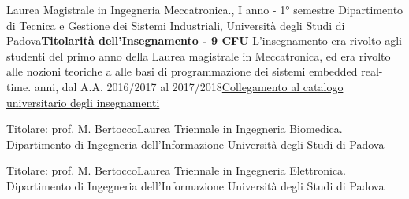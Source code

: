 {
    {Laurea Magistrale in Ingegneria Meccatronica., I anno - 1° semestre}
    {\newline  Dipartimento di Tecnica e Gestione dei Sistemi Industriali, Università degli Studi di Padova\newline \textbf{Titolarità dell'Insegnamento - 9 CFU}\newline
        L'insegnamento era rivolto agli studenti del primo anno della Laurea magistrale in Meccatronica, ed era rivolto alle nozioni teoriche a alle basi di programmazione dei sistemi embedded real-time.}{ anni, dal A.A. 2016/2017 al 2017/2018}{\href{https://didattica.unipd.it/off/2017/LM/IN/IN0529/000ZZ/IN01122661/N0}{Collegamento al catalogo universitario degli insegnamenti}}


{Titolare: prof. M. Bertocco\newline Laurea Triennale in Ingegneria Biomedica.\newline
Dipartimento di Ingegneria dell'Informazione}
{Università degli Studi di Padova}{}{}

{Titolare: prof. M. Bertocco\newline Laurea Triennale in Ingegneria Elettronica.\newline
Dipartimento di Ingegneria dell'Informazione}
{Università degli Studi di Padova}{}{}
}


